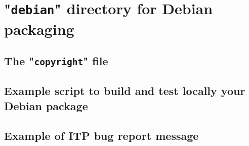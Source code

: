 \section{"\texttt{debian}" directory for Debian packaging}



\subsection{The "\texttt{copyright}" file}
\label{acopy}
{\notsotiny{

}}

\subsection{Example script to build and test locally your Debian package}
\label{btdebs}

{\tiny{

}}

\subsection{Example of ITP bug report message}
\label{bugreport}

